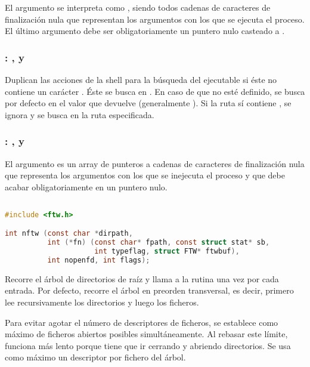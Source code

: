 El argumento  se interpreta como , siendo todos cadenas de caracteres de finalización nula que representan los argumentos con los que se ejecuta el proceso.
El último argumento debe ser obligatoriamente un puntero nulo casteado a .

\subsubsection{: ,  y }

Duplican las acciones de la shell para la búsqueda del ejecutable si éste no contiene un carácter \code{/}.
Éste se busca en .
En caso de que no esté definido, se busca por defecto en el valor que devuelve  (generalmente ).
Si la ruta sí contiene \code{/}, se ignora  y se busca en la ruta especificada.

\subsubsection{: ,  y }

El argumento  es un array de punteros a cadenas de caracteres de finalización nula que representa los argumentos con los que se inejecuta el proceso y que debe acabar obligatoriamente en un puntero nulo.

\subsection{}\label{ntfw}

\begin{lstlisting}[language=C]
#include <ftw.h>

int nftw (const char *dirpath,
          int (*fn) (const char* fpath, const struct stat* sb,
                     int typeflag, struct FTW* ftwbuf),
          int nopenfd, int flags);
\end{lstlisting}

Recorre el árbol de directorios de raíz  y llama a la rutina  una vez por cada entrada.
Por defecto, recorre el árbol en preorden transversal, es decir, primero lee recursivamente los directorios y luego los ficheros.

Para evitar agotar el número de descriptores de ficheros, se establece  como máximo de ficheros abiertos posibles simultáneamente.
Al rebasar este límite,  funciona más lento porque tiene que ir cerrando y abriendo directorios.
Se usa como máximo un descriptor por fichero del árbol.

